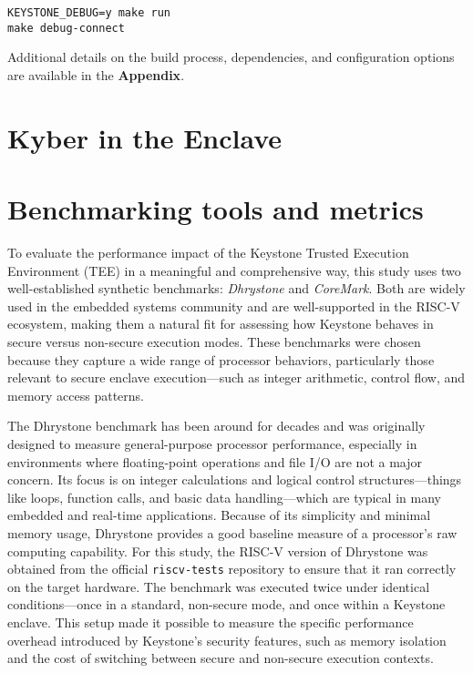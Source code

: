 \begin{verbatim}
KEYSTONE_DEBUG=y make run
make debug-connect
\end{verbatim}

Additional details on the build process, dependencies, and configuration options are available in the \textbf{Appendix}.

\section{Kyber in the Enclave}
\label{sec:kyber-enclave}

\section{Benchmarking tools and metrics}
\label{sec:benchmarking-tools}

To evaluate the performance impact of the Keystone Trusted Execution Environment (TEE) in a meaningful and comprehensive way, this study uses two well-established synthetic benchmarks: \textit{Dhrystone} and \textit{CoreMark}. Both are widely used in the embedded systems community and are well-supported in the RISC-V ecosystem, making them a natural fit for assessing how Keystone behaves in secure versus non-secure execution modes. These benchmarks were chosen because they capture a wide range of processor behaviors, particularly those relevant to secure enclave execution—such as integer arithmetic, control flow, and memory access patterns.

The Dhrystone benchmark has been around for decades and was originally designed to measure general-purpose processor performance, especially in environments where floating-point operations and file I/O are not a major concern. Its focus is on integer calculations and logical control structures—things like loops, function calls, and basic data handling—which are typical in many embedded and real-time applications. Because of its simplicity and minimal memory usage, Dhrystone provides a good baseline measure of a processor’s raw computing capability. For this study, the RISC-V version of Dhrystone was obtained from the official \texttt{riscv-tests} repository to ensure that it ran correctly on the target hardware. The benchmark was executed twice under identical conditions—once in a standard, non-secure mode, and once within a Keystone enclave. This setup made it possible to measure the specific performance overhead introduced by Keystone’s security features, such as memory isolation and the cost of switching between secure and non-secure execution contexts.

